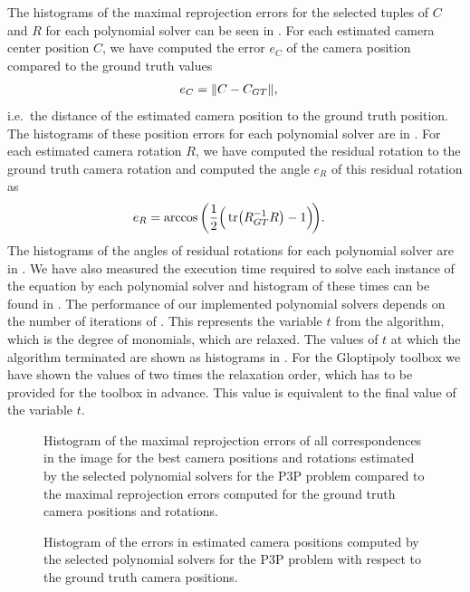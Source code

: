 The histograms of the maximal reprojection errors for the selected tuples of $C$ and $R$ for each polynomial solver can be seen in .
For each estimated camera center position $C$, we have computed the error $e_C$ of the camera position compared to the ground truth values
\begin{align}
  e_C &= \|C-C_{GT}\|, \labeleq{app:P3P:CDist}
\end{align}
i.e.\ the distance of the estimated camera position to the ground truth position.
The histograms of these position errors for each polynomial solver are in .
For each estimated camera rotation $R$, we have computed the residual rotation to the ground truth camera rotation and computed the angle $e_R$ of this residual rotation as
\begin{align}
  e_R &= \arccos\bigg(\frac{1}{2}\Big(\tr\!\big(R_{GT}^{-1}R\big)-1\Big)\!\bigg). \labeleq{app:P3P:RAngle}
\end{align}
The histograms of the angles of residual rotations for each polynomial solver are in .
We have also measured the execution time required to solve each instance of the equation  by each polynomial solver and histogram of these times can be found in .
The performance of our implemented polynomial solvers depends on the number of iterations of .
This represents the variable $t$ from the algorithm, which is the degree of monomials, which are relaxed.
The values of $t$ at which the algorithm terminated are shown as histograms in .
For the Gloptipoly toolbox we have shown the values of two times the relaxation order, which has to be provided for the toolbox in advance.
This value is equivalent to the final value of the variable $t$.

\begin{figure}[ht]
  \centering
  \resizebox{0.95\textwidth}{!}{}
  \caption{Histogram of the maximal reprojection errors of all correspondences in the image for the best camera positions and rotations estimated by the selected polynomial solvers for the P3P problem compared to the maximal reprojection errors computed for the ground truth camera positions and rotations.}
\end{figure}

\begin{figure}[ht]
  \centering
  \resizebox{0.95\textwidth}{!}{}
  \caption{Histogram of the errors in estimated camera positions computed by the selected polynomial solvers for the P3P problem with respect to the ground truth camera positions.}
\end{figure}

